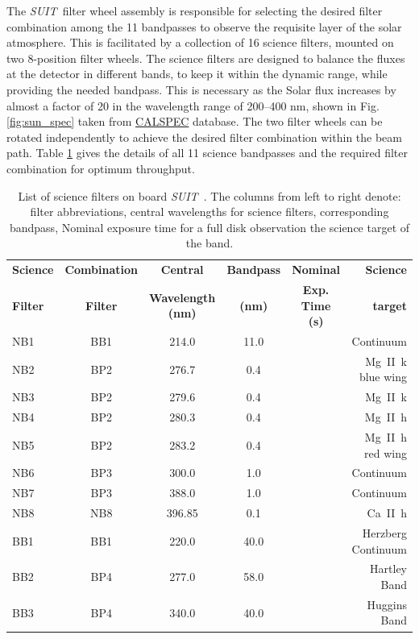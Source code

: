 \documentclass[12pt]{spieman}  %
\newcommand{\suit}{{\it SUIT~}}
\begin{document}
The \suit filter wheel assembly is responsible for selecting the desired filter combination among the 11 bandpasses to observe the requisite layer of the solar atmosphere. This is facilitated by a collection of 16 science filters, mounted on two 8-position filter wheels. The science filters are designed to balance the fluxes at the detector in different bands, to keep it within the dynamic range, while providing the needed bandpass. This is necessary as the Solar flux increases by almost a factor of 20 in the wavelength range of 200{--}400 nm, shown in Fig. \ref{fig:sun_spec} taken from \href{https://www.stsci.edu/hst/instrumentation/reference-data-for-calibration-and-tools/astronomical-catalogs/calspec}{CALSPEC} \cite{bohlin14,bohlin20,bohlin22} database. The two filter wheels can be rotated independently to achieve the desired filter combination within the beam path. Table \ref{tab:science_filters} gives the details of all 11 science bandpasses and the required filter combination for optimum throughput.

\begin{table}[ht]
\caption{List of science filters on board \suit. The columns from left to right denote: filter abbreviations, central wavelengths for science filters, corresponding bandpass, Nominal exposure time for a full disk observation the science target of the band.} 
\label{tab:science_filters}
\begin{center}
\begin{tabular}{||l|c|c|c|c|r||}
\hline
\textbf{Science}  &	\textbf{Combination} &	\textbf{Central} & \textbf{Bandpass}& \textbf{Nominal} &\textbf{Science} \\
\textbf{Filter}	&	\textbf{Filter}     &	\textbf{Wavelength  (nm)}	&		\textbf{(nm)	}	    & \textbf{Exp. Time (s)}	&\textbf{target}		\\
\hline
NB1     & BB1 		& 214.0 		    & 11.0 		&		& Continuum\\
NB2 	& BP2		& 276.7				& 0.4 		&		& Mg~\rm{II}~k blue wing \\
NB3 	& BP2		& 279.6 			& 0.4 		&		& Mg~\rm{II}~k\\
NB4 	& BP2		& 280.3				& 0.4 		&		& Mg~\rm{II}~h\\
NB5		& BP2		& 283.2				& 0.4 		&		& Mg~\rm{II}~h red wing\\
NB6 	& BP3		& 300.0 			&1.0 		&		& Continuum\\
NB7 	& BP3		& 388.0				&1.0 		&		& Continuum\\
NB8		& NB8		& 396.85 			& 0.1 		&		& Ca~\rm{II}~h\\
BB1 	& BB1		& 220.0				& 40.0 		&		& Herzberg Continuum \\
BB2 	& BP4		& 277.0 			& 58.0       &       & Hartley Band\\
BB3 	& BP4		& 340.0				& 40.0        &      & Huggins Band\\
\hline
\end{tabular}
\end{center}
\end{table}
\end{document}
